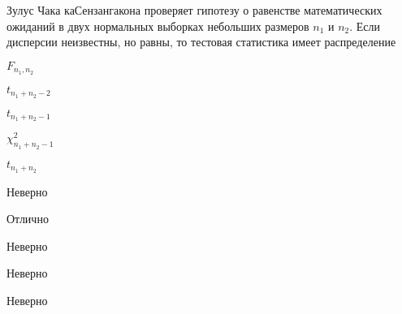 
\begin{question}
Зулус Чака каСензангакона проверяет гипотезу о равенстве математических
ожиданий в двух нормальных выборках небольших размеров \(n_1\) и
\(n_2\). Если дисперсии неизвестны, но равны, то тестовая статистика
имеет распределение
\begin{answerlist}
  \item \(F_{n_1,n_2}\)
  \item \(t_{n_1+n_2-2}\)
  \item \(t_{n_1+n_2-1}\)
  \item \(\chi^2_{n_1+n_2-1}\)
  \item \(t_{n_1+n_2}\)
\end{answerlist}
\end{question}

\begin{solution}
\begin{answerlist}
  \item Неверно
  \item Отлично
  \item Неверно
  \item Неверно
  \item Неверно
\end{answerlist}
\end{solution}

